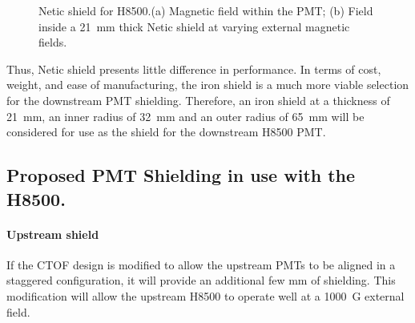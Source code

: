 \documentclass[12pt]{article}
\begin{document}
\begin{figure}[ht]
\centering
{}
\qquad
{}
\caption{\small{Netic shield for H8500.(a) Magnetic field within the PMT;
 (b) Field inside  a 21~mm thick Netic shield at varying external 
magnetic fields.}}
\label{Upstream_NETIC_21mm}
\end{figure}
Thus, Netic shield presents little difference
in performance. In terms of cost, weight, and ease of manufacturing, 
the iron shield is a much more viable selection for the downstream PMT shielding. 
Therefore, an iron shield at a thickness
of 21~mm, an inner radius of 32~mm and an outer radius of 65~mm will be 
considered for use as 
the shield for the downstream H8500 PMT.
\clearpage
\subsection{Proposed PMT Shielding  in use with the H8500.}%

\paragraph{Upstream shield}
If the CTOF design is modified to allow 
the upstream PMTs to be aligned in a staggered configuration, 
it will provide an additional few mm of shielding. 
This modification will allow the upstream H8500 to operate well at
a 1000~G external field. 
\end{document}
